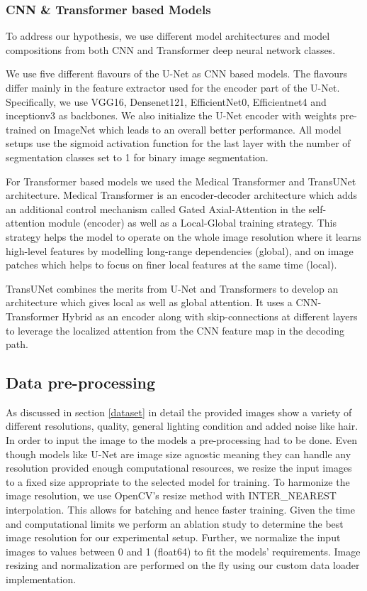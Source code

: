 \subsubsection{CNN \& Transformer based Models}

To address our hypothesis, we use different model architectures and model compositions from both CNN and Transformer deep neural network classes.

\par
We use five different flavours of the U-Net as CNN based models. The flavours differ mainly in the feature extractor used for the encoder part of the U-Net. Specifically, we use VGG16, Densenet121, EfficientNet0, Efficientnet4 and inceptionv3 as backbones. We also initialize the U-Net encoder with weights pre-trained on ImageNet which leads to an overall better performance. All model setups use the sigmoid activation function for the last layer with the number of segmentation classes set to 1  for binary image segmentation.

\par
For Transformer based models we used the Medical Transformer and TransUNet architecture. Medical Transformer is an encoder-decoder architecture which adds an additional control mechanism called Gated Axial-Attention in the self-attention module (encoder) as well as a Local-Global training strategy. This strategy helps the model to operate on the whole image resolution where it learns high-level features by modelling long-range dependencies (global), and on image patches which helps to focus on finer local features at the same time (local).

\par
TransUNet combines the merits from U-Net and Transformers to develop an architecture which gives local as well as global attention. It uses a CNN-Transformer Hybrid as an encoder along with skip-connections at different layers to leverage the localized attention from the CNN feature map in the decoding path.


\subsection{Data pre-processing}
As discussed in section \ref{dataset} in detail the provided images show a variety of different resolutions, quality, general lighting condition and added noise like hair. In order to input the image to the models a pre-processing had to be done. Even though models like U-Net are image size agnostic meaning they can handle any resolution provided enough computational resources, we resize the input images to a fixed size appropriate to the selected model for training. To harmonize the image resolution, we use OpenCV’s resize method with INTER\_NEAREST interpolation. This allows for batching and hence faster training. Given the time and computational limits we perform an ablation study to determine the best image resolution for our experimental setup. Further, we normalize the input images to values between 0 and 1 (float64) to fit the models’ requirements. Image resizing and normalization are performed on the fly using our custom data loader implementation.


